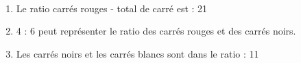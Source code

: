    \ \\ [-5mm]
   \begin{enumerate}
      \item Le ratio carrés rouges - total de carré est { : 21}
      \item 4 : 6 peut représenter le {\blue ratio des carrés rouges et} {\blue des carrés noirs.}
      \item Les carrés noirs et les carrés blancs sont dans le ratio { : 11}
   \end{enumerate}
